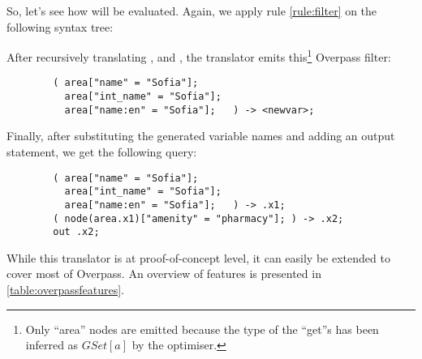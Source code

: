 \documentclass[main.tex]{subfiles}
\begin{document}
\begin{example}
    So, let's see how  will be evaluated. Again, we apply
    rule \ref{rule:filter} on the following syntax tree:

    After recursively translating , 
    and , the translator emits this\footnote{
        Only ``area'' nodes are emitted because the type of the ``get''s has
        been inferred as $GSet[a]$ by the optimiser.
    } Overpass filter:

    \begin{lstwrap}\begin{lstlisting}
        ( area["name" = "Sofia"];
          area["int_name" = "Sofia"];
          area["name:en" = "Sofia"];   ) -> <newvar>;
    \end{lstlisting}\end{lstwrap}

    Finally, after substituting the generated variable names and adding
    an output statement, we get the following query:

    \begin{lstwrap}\begin{lstlisting}
        ( area["name" = "Sofia"];
          area["int_name" = "Sofia"];
          area["name:en" = "Sofia"];   ) -> .x1;
        ( node(area.x1)["amenity" = "pharmacy"]; ) -> .x2;
        out .x2;
    \end{lstlisting}\end{lstwrap}
\end{example}

While this translator is at proof-of-concept level, it can easily be extended
to cover most of Overpass. An overview of features is presented in
\cref{table:overpassfeatures}.
\end{document}
